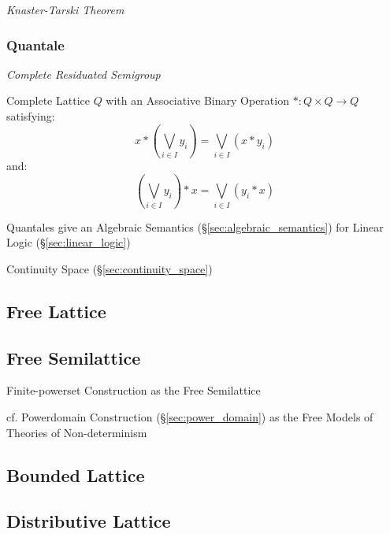 \emph{Knaster-Tarski Theorem}



\subsubsection{Quantale}\label{sec:quantale}

\emph{Complete Residuated Semigroup}

Complete Lattice $Q$ with an Associative Binary Operation $* : Q
\times Q \rightarrow Q$ satisfying:
\[
  x*(\bigvee_{i \in I} y_i) = \bigvee_{i \in I}(x * y_i)
\]
and:
\[
  (\bigvee_{i \in I} y_i)*x = \bigvee_{i \in I}(y_i * x)
\]

Quantales give an Algebraic Semantics
(\S\ref{sec:algebraic_semantics}) for Linear Logic
(\S\ref{sec:linear_logic})

Continuity Space (\S\ref{sec:continuity_space})



\subsection{Free Lattice}\label{sec:free_lattice}

\subsection{Free Semilattice}\label{sec:free_semilattice}

Finite-powerset Construction as the Free Semilattice %

cf. Powerdomain Construction (\S\ref{sec:power_domain}) as the Free
Models of Theories of Non-determinism



\subsection{Bounded Lattice}\label{sec:bounded_lattice}

\subsection{Distributive Lattice}\label{sec:distributive_lattice}

